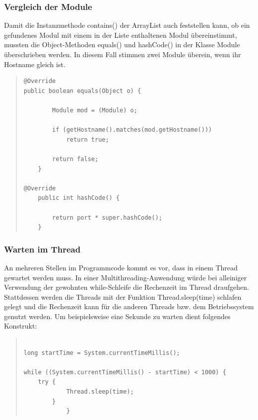 \documentclass[a4paper,14pt,headsepline]{scrartcl}
\begin{document}
\newpage

\subsubsection*{Vergleich der Module}

Damit die Instanzmethode contains() der ArrayList auch feststellen kann, ob ein gefundenes Modul mit einem in der Liste enthaltenen Modul übereinstimmt, mussten die Object-Methoden equals() und hashCode() in der Klasse Module überschrieben werden. In diesem Fall stimmen zwei Module überein, wenn ihr Hostname gleich ist. 


\begin{quote}
\begin{verbatim}
@Override
public boolean equals(Object o) {
		
		Module mod = (Module) o;
		
		if (getHostname().matches(mod.getHostname()))
			return true;
		
		return false;
	}
	
@Override
	public int hashCode() {
		
		return port * super.hashCode();
	}
\end{verbatim}
\end{quote} 

\newpage
\subsubsection*{Warten im Thread}

An mehreren Stellen im Programmcode kommt es vor, dass in einem Thread gewartet werden muss. In einer Multithreading-Anwendung würde bei alleiniger Verwendung der gewohnten while-Schleife die Rechenzeit im Thread draufgehen. Stattdessen werden die Threads mit der Funktion Thread.sleep(time) schlafen gelegt und die Rechenzeit kann für die anderen Threads bzw. dem Betriebssystem genutzt werden. Um beispielsweise eine Sekunde zu warten dient folgendes Konstrukt:     

\begin{quote}
\begin{verbatim}

long startTime = System.currentTimeMillis();

while ((System.currentTimeMillis() - startTime) < 1000) {
    try {
            Thread.sleep(time);
        }	
			}

\end{verbatim}
\end{quote} 
\end{document}
